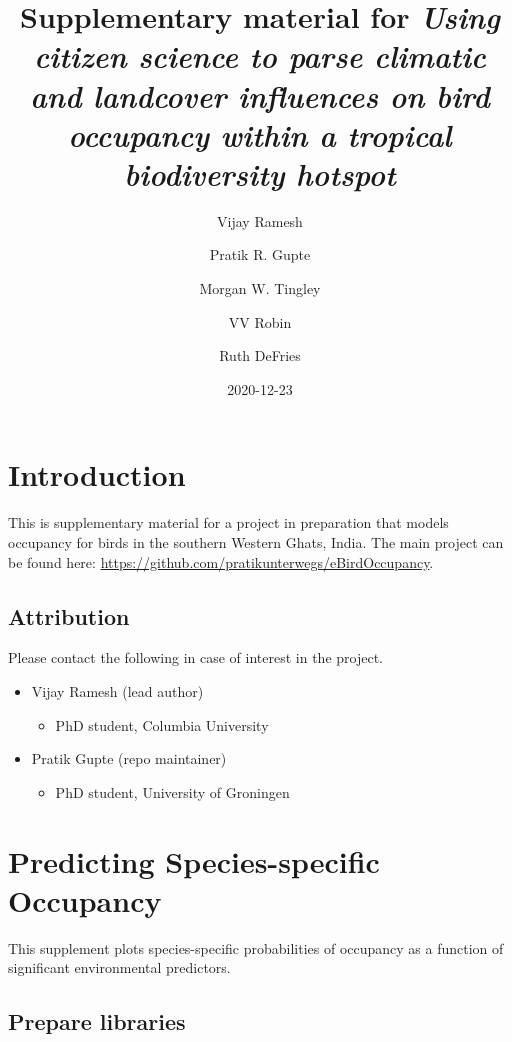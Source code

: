 \documentclass[]{article}
\title{Supplementary material for \emph{Using citizen science to parse climatic and landcover influences on bird occupancy within a tropical biodiversity hotspot}}
\author{Vijay Ramesh \and Pratik R. Gupte \and Morgan W. Tingley \and VV Robin \and Ruth DeFries}
\date{2020-12-23}
\providecommand{\tightlist}{%
  \setlength{\itemsep}{0pt}\setlength{\parskip}{0pt}}
\begin{document}
\maketitle


\linenumbers

{
\setcounter{tocdepth}{2}
\tableofcontents
}
\hypertarget{introduction}{%
\section{Introduction}\label{introduction}}

This is supplementary material for a project in preparation that models occupancy for birds in the southern Western Ghats, India.
The main project can be found here: \url{https://github.com/pratikunterwegs/eBirdOccupancy}.

\hypertarget{attribution}{%
\subsection{Attribution}\label{attribution}}

Please contact the following in case of interest in the project.

\begin{itemize}
\tightlist
\item
  Vijay Ramesh (lead author)

  \begin{itemize}
  \tightlist
  \item
    PhD student, Columbia University
  \end{itemize}
\item
  Pratik Gupte (repo maintainer)

  \begin{itemize}
  \tightlist
  \item
    PhD student, University of Groningen
  \end{itemize}
\end{itemize}

\hypertarget{predicting-species-specific-occupancy}{%
\section{Predicting Species-specific Occupancy}\label{predicting-species-specific-occupancy}}

This supplement plots species-specific probabilities of occupancy as a function of significant environmental predictors.

\hypertarget{prepare-libraries}{%
\subsection{Prepare libraries}\label{prepare-libraries}}
\end{document}
